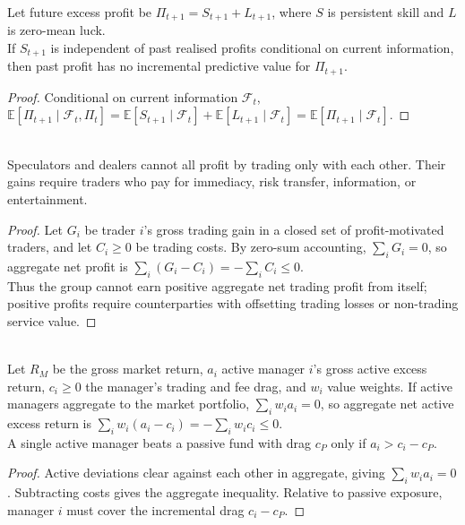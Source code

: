 \begin{proposition} \\
Let future excess profit be $\Pi_{t+1}=S_{t+1}+L_{t+1}$, where $S$ is persistent skill and $L$ is zero-mean luck.\\
If $S_{t+1}$ is independent of past realised profits conditional on current information, then past profit has no incremental predictive value for $\Pi_{t+1}$.
\begin{proof}
Conditional on current information $\mathcal{F}_t$, $\mathbb{E}[\Pi_{t+1}\mid \mathcal{F}_t,\Pi_t]=\mathbb{E}[S_{t+1}\mid \mathcal{F}_t]+\mathbb{E}[L_{t+1}\mid \mathcal{F}_t]=\mathbb{E}[\Pi_{t+1}\mid \mathcal{F}_t]$.
\end{proof}
\end{proposition}

\begin{corollary} \\
Speculators and dealers cannot all profit by trading only with each other. Their gains require traders who pay for immediacy, risk transfer, information, or entertainment.
\begin{proof}
Let $G_i$ be trader $i$'s gross trading gain in a closed set of profit-motivated traders, and let $C_i\ge0$ be trading costs. By zero-sum accounting, $\sum_i G_i=0$, so aggregate net profit is $\sum_i (G_i-C_i)=-\sum_i C_i\le0$.\\
Thus the group cannot earn positive aggregate net trading profit from itself; positive profits require counterparties with offsetting trading losses or non-trading service value.
\end{proof}
\end{corollary}

\begin{corollary} \\
Let $R_M$ be the gross market return, $a_i$ active manager $i$'s gross active excess return, $c_i\ge0$ the manager's trading and fee drag, and $w_i$ value weights. If active managers aggregate to the market portfolio, $\sum_i w_i a_i=0$, so aggregate net active excess return is $\sum_i w_i(a_i-c_i)=-\sum_i w_i c_i\le0$.\\
A single active manager beats a passive fund with drag $c_P$ only if $a_i>c_i-c_P$.
\begin{proof}
Active deviations clear against each other in aggregate, giving $\sum_i w_i a_i=0$. Subtracting costs gives the aggregate inequality. Relative to passive exposure, manager $i$ must cover the incremental drag $c_i-c_P$.
\end{proof}
\end{corollary}

